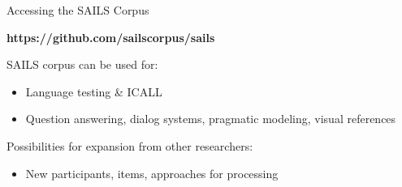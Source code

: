 \documentclass[final,t]{beamer}
\begin{document}
\begin{frame}{}
\begin{columns}[t]
\begin{column}{.33\linewidth}
\begin{block}{Accessing the SAILS Corpus}
\begin{center}
\begin{minipage}{.85\textwidth}
\begin{center}
\textbf{https://github.com/sailscorpus/sails}
\end{center}

SAILS corpus can be used for:
\begin{itemize}
\item Language testing \& ICALL
\item Question answering, dialog systems, pragmatic modeling, visual references
\end{itemize}

\bigskip

Possibilities for expansion from other researchers: 
\begin{itemize}
\item New participants, items, approaches for processing
\end{itemize}

\end{minipage}
\end{center}
\end{block}

\end{column}

\end{columns}
\end{frame}
\end{document}
